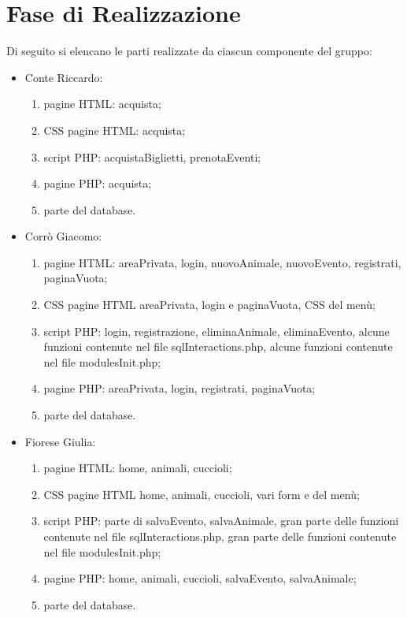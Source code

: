 \section{Fase di Realizzazione}
Di seguito si elencano le parti realizzate da ciascun componente del gruppo:
\begin{itemize}
    \item Conte Riccardo:
        \begin{enumerate}
        \item pagine HTML: acquista;
        \item CSS pagine HTML: acquista;
        \item script PHP: acquistaBiglietti, prenotaEventi;
        \item pagine PHP: acquista;
        \item parte del database.
        \end{enumerate}
    \item Corrò Giacomo:
        \begin{enumerate}
            \item pagine HTML: areaPrivata, login, nuovoAnimale, nuovoEvento, registrati, paginaVuota;
            \item CSS pagine HTML areaPrivata, login e paginaVuota, CSS del menù;
            \item script PHP: login, registrazione, eliminaAnimale, eliminaEvento, alcune funzioni contenute nel file sqlInteractions.php, alcune funzioni contenute nel file modulesInit.php;
            \item pagine PHP: areaPrivata, login, registrati, paginaVuota;
            \item parte del database.
        \end{enumerate}
    \item Fiorese Giulia:
        \begin{enumerate}
            \item pagine HTML: home, animali, cuccioli;
            \item CSS pagine HTML home, animali, cuccioli, vari form e del menù;
            \item script PHP: parte di salvaEvento, salvaAnimale, gran parte delle funzioni contenute nel file sqlInteractions.php, gran parte delle funzioni contenute nel file modulesInit.php;
            \item pagine PHP: home, animali, cuccioli, salvaEvento, salvaAnimale;
            \item parte del database.
        \end{enumerate}

\end{itemize}
